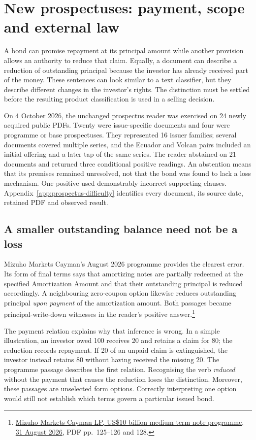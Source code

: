 \section{New prospectuses: payment, scope and external law}
\label{sec:prospectus-difficulty}

A bond can promise repayment at its principal amount while another provision
allows an authority to reduce that claim. Equally, a document can describe a
reduction of outstanding principal because the investor has already received
part of the money. These sentences can look similar to a text classifier, but
they describe different changes in the investor's rights. The distinction
must be settled before the resulting product classification is used in a
selling decision.

On 4 October 2026, the unchanged prospectus reader was exercised on 24 newly
acquired public PDFs. Twenty were issue-specific documents and four were
programme or base prospectuses. They represented 16 issuer families; several
documents covered multiple series, and the Ecuador and Volcan pairs included
an initial offering and a later tap of the same series. The reader abstained
on 21 documents and returned three conditional positive readings. An abstention
means that its premises remained unresolved, not that the bond was found to
lack a loss mechanism. One positive used demonstrably incorrect supporting
clauses. Appendix~\ref{app:prospectus-difficulty} identifies every document,
its source date, retained PDF and observed result.

\subsection{A smaller outstanding balance need not be a loss}

Mizuho Markets Cayman's August 2026 programme provides the clearest error.
Its form of final terms says that amortizing notes are partially redeemed at
the specified Amortization Amount and that their outstanding principal is
reduced accordingly. A neighbouring zero-coupon option likewise reduces
outstanding principal \emph{upon payment} of the amortization amount. Both
passages became principal-write-down witnesses in the reader's positive
answer.\footnote{\href{../prospectus/difficulty-2026-10-04/pdfs/case-105635287.pdf}
{Mizuho Markets Cayman LP, US\$10 billion medium-term note programme,
31 August 2026}, PDF pp.~125--126 and 128.}

The payment relation explains why that inference is wrong. In a simple
illustration, an investor owed 100 receives 20 and retains a claim for 80;
the reduction records repayment. If 20 of an unpaid claim is extinguished,
the investor instead retains 80 without having received the missing 20.
The programme passage describes the first relation. Recognising the verb
\emph{reduced} without the payment that causes the reduction loses the
distinction. Moreover, these passages are unselected form options.
Correctly interpreting one option would still not establish which terms
govern a particular issued bond.

